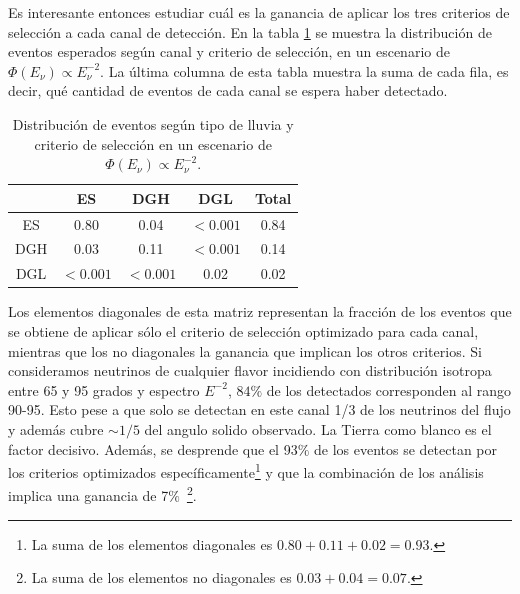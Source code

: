 	Es interesante entonces estudiar cuál es la ganancia de aplicar los tres criterios de selección a cada canal de detección.
	En la tabla \ref{tab:expDist} se muestra la distribución de eventos esperados según canal y criterio de selección, en un escenario de $\Phi(E_\nu)\propto E_\nu^{-2}$.
	La última columna de esta tabla muestra la suma de cada fila, es decir, qué cantidad de eventos de cada canal se espera haber detectado.
	\begin{table}[ht!]
		\begin{center}\renewcommand{\arraystretch}{1.4}
			\begin{tabular}{|c|c|c|c|c|}
			\hline
			\diagbox{Lluvia}{Criterio} & ES & DGH & DGL  & Total\\ \hline
			ES     &    0.80       &    0.04       &     $<0.001$ & 0.84 \\ \hline
			DGH    &    0.03       &    0.11       &     $<0.001$ & 0.14 \\ \hline
			DGL    &    $<0.001$   &    $<0.001$   &     0.02     & 0.02 \\
			\hline
			\end{tabular}
		\end{center}
		
		\caption{\label{tab:expDist}Distribución de eventos según tipo de lluvia y criterio de selección en un escenario de $\Phi(E_\nu)\propto E_\nu^{-2}$.}
	\end{table}
	Los elementos diagonales de esta matriz representan la fracción de los eventos que se obtiene de aplicar sólo el criterio de selección optimizado para cada canal, mientras que los no diagonales la ganancia que implican los otros criterios.
	Si consideramos neutrinos de cualquier flavor incidiendo con distribuci\'on isotropa entre 65 y 95 grados y espectro $E^{-2}$, $84\%$ de los detectados corresponden al rango 90-95. 
	Esto pese a que solo se detectan en este canal 1/3 de los neutrinos del flujo y adem\'as cubre $\sim 1/5$ del angulo solido observado.
	La Tierra como blanco es el factor decisivo.
	Adem\'as, se desprende que el 93$\%$ de los eventos se detectan por los criterios optimizados específicamente\footnote{La suma de los elementos diagonales es $0.80+0.11+0.02=0.93$.} y que la combinación de los análisis implica una ganancia de 7$\%$~\footnote{La suma de los elementos no diagonales es $0.03+0.04=0.07$.}.
